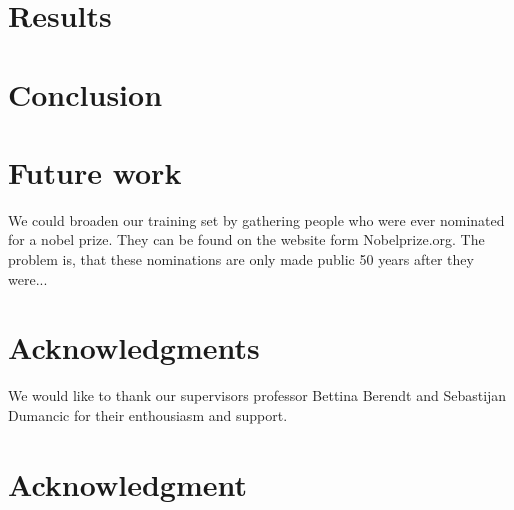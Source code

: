 \documentclass[11pt,journal,compsoc]{IEEEtran}
\begin{document}




\section{Results}
\label{sec:results}

\section{Conclusion}

\section{Future work}

We could broaden our training set by gathering people who were ever nominated for a nobel prize. They can be found on the website form Nobelprize.org. The problem is, that these nominations are only made public 50 years after they were...

\ifCLASSOPTIONcompsoc
  \section*{Acknowledgments}
  We would like to thank our supervisors professor Bettina Berendt and Sebastijan Dumancic for their enthousiasm and support.
\else
  \section*{Acknowledgment}
\fi


%
\end{document}

